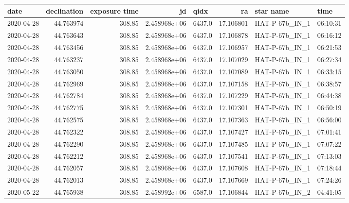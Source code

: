 \documentclass{aastex631}
\begin{document}
\begin{tabular}{lrrrlrll}
    \toprule
    date       & declination & exposure time & jd           & qidx   & ra        & star name                  & time     \\
    \midrule
    2020-04-28 & 44.763974   & 308.85        & 2.458968e+06 & 6437.0 & 17.106801 & HAT-P-67b\_IN\_1           & 06:10:31 \\
    2020-04-28 & 44.763643   & 308.85        & 2.458968e+06 & 6437.0 & 17.106878 & HAT-P-67b\_IN\_1           & 06:16:12 \\
    2020-04-28 & 44.763456   & 308.85        & 2.458968e+06 & 6437.0 & 17.106957 & HAT-P-67b\_IN\_1           & 06:21:53 \\
    2020-04-28 & 44.763237   & 308.85        & 2.458968e+06 & 6437.0 & 17.107029 & HAT-P-67b\_IN\_1           & 06:27:34 \\
    2020-04-28 & 44.763050   & 308.85        & 2.458968e+06 & 6437.0 & 17.107089 & HAT-P-67b\_IN\_1           & 06:33:15 \\
    2020-04-28 & 44.762969   & 308.85        & 2.458968e+06 & 6437.0 & 17.107158 & HAT-P-67b\_IN\_1           & 06:38:57 \\
    2020-04-28 & 44.762784   & 308.85        & 2.458968e+06 & 6437.0 & 17.107229 & HAT-P-67b\_IN\_1           & 06:44:38 \\
    2020-04-28 & 44.762775   & 308.85        & 2.458968e+06 & 6437.0 & 17.107301 & HAT-P-67b\_IN\_1           & 06:50:19 \\
    2020-04-28 & 44.762575   & 308.85        & 2.458968e+06 & 6437.0 & 17.107363 & HAT-P-67b\_IN\_1           & 06:56:00 \\
    2020-04-28 & 44.762322   & 308.85        & 2.458968e+06 & 6437.0 & 17.107427 & HAT-P-67b\_IN\_1           & 07:01:41 \\
    2020-04-28 & 44.762290   & 308.85        & 2.458968e+06 & 6437.0 & 17.107485 & HAT-P-67b\_IN\_1           & 07:07:22 \\
    2020-04-28 & 44.762212   & 308.85        & 2.458968e+06 & 6437.0 & 17.107541 & HAT-P-67b\_IN\_1           & 07:13:03 \\
    2020-04-28 & 44.762057   & 308.85        & 2.458968e+06 & 6437.0 & 17.107608 & HAT-P-67b\_IN\_1           & 07:18:44 \\
    2020-04-28 & 44.762013   & 308.85        & 2.458968e+06 & 6437.0 & 17.107669 & HAT-P-67b\_IN\_1           & 07:24:26 \\
    2020-05-22 & 44.765938   & 308.85        & 2.458992e+06 & 6587.0 & 17.106844 & HAT-P-67b\_IN\_2           & 04:41:05 \\

\end{tabular}
\end{document}

